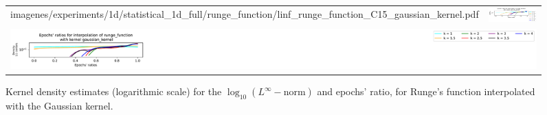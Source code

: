 \documentclass[12pt]{report} %
\begin{document}
\begin{figure}[H]
\begin{tabular}{rl}
{    {imagenes/experiments/1d/statistical_1d_full/runge_function/linf_runge_function_C15_gaussian_kernel.pdf}}
                                                                                                              & {\includegraphics[width=.62\textwidth, trim={1.05cm 1.4cm 2.88cm 1.17cm},clip=true]
        {imagenes/experiments/1d/statistical_1d_full/runge_function/epochs_runge_function_C15_gaussian_kernel.pdf}}
    \\
    \multicolumn{2}{c}{{\includegraphics[width=.55\textwidth, trim={46cm 2.9cm 0 0},clip=true]
          {imagenes/experiments/1d/statistical_1d_full/runge_function/runge_function_legend.pdf}}}
  \end{tabular}
  \caption{Kernel density estimates (logarithmic scale) for the $\log_{10}(L^\infty-\text{norm})$ and epochs' ratio, for Runge's function interpolated with the Gaussian kernel.}
  \label{fig:statistic-result-kde-runge-function-gaussian-kernel}
\end{figure}
\end{document}
